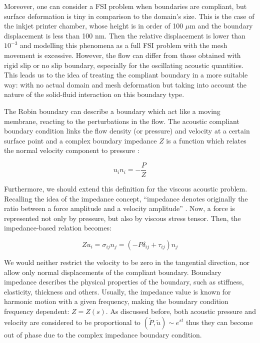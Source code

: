 Moreover, one can consider a FSI problem when boundaries are compliant, but surface deformation is tiny in comparison to the domain's size. This is the case of the inkjet printer chamber, whose height is in order of 100 $\mu$m and the boundary displacement is less than 100 nm. Then the relative displacement is lower than $10^{-3}$ and modelling this phenomena as a full FSI problem with the mesh movement is excessive. However, the flow can differ from those obtained with rigid slip or no slip boundary, especially for the oscillating acoustic quantities. This leads us to the idea of treating the compliant boundary in a more suitable way: with no actual domain and mesh deformation but taking into account the nature of the solid-fluid interaction on this boundary type.

The Robin boundary can describe a boundary which act like a moving membrane, reacting to the perturbations in the flow. The acoustic compliant boundary condition links the flow density (or pressure) and velocity at a certain surface point and a complex boundary impedance $Z$ is a function which relates the normal velocity component to pressure \cite{Myers1980}:

\begin{equation}
\label{eq:InitImpedAcoustic}
u_i n_i = - \frac{P}{Z}
\end{equation}

Furthermore, we should extend this definition for the viscous acoustic problem. Recalling the idea of the impedance concept, \enquote{impedance denotes originally the ratio between a force amplitude and a velocity amplitude} \cite{rienstra}. Now, a force is represented not only by pressure, but also by viscous stress tensor. Then, the impedance-based relation becomes:

\begin{equation}
\label{eq:InitImped}
Z u_i = \sigma_{ij} n_j  =   (-P \delta_{ij} + \tau_{ij}) n_j
\end{equation}

We would neither restrict the velocity to be zero in the tangential direction, nor allow only normal displacements of the compliant boundary. Boundary impedance describes the physical properties of the boundary, such as stiffness, elasticity, thickness and others. Usually, the impedance value is known for harmonic motion with a given frequency, making the boundary condition frequency dependent: $Z = Z(s)$. As discussed before, both acoustic pressure and velocity are considered to be proportional to $(\tilde{P}, \tilde{u}) \sim e^{st}$ thus they can become out of phase due to the complex impedance boundary condition.

